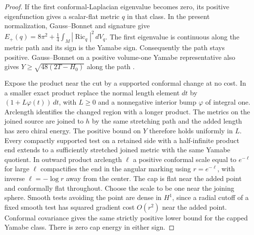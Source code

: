 \documentclass[11pt,letterpaper]{article}
\numberwithin{equation}{section}
\DeclareMathOperator{\Ric}{Ric}
\begin{document}
\begin{proof}
If the first conformal-Laplacian eigenvalue becomes zero, its
positive eigenfunction gives a scalar-flat metric \(q\) in that
class. In the present normalization, Gauss--Bonnet and signature
give \(E_+(q)=8\pi^2+\frac14\int_M|\Ric_q|^2\,dV_q\).
The first eigenvalue is continuous along the metric path and its
sign is the Yamabe sign. Consequently the path stays positive.
Gauss--Bonnet on a positive volume-one Yamabe representative
also gives \(Y\ge\sqrt{48(2T-H_0)}\) along the path
\cite[\S2]{LeeParker1987Yamabe}
\cite[A short marked cut]{Baker2026FixedDescent}.

Expose the product near the cut by a supported conformal change
at no cost. In a smaller exact product replace the normal
length element \(dt\) by \((1+L\varphi(t))\,dt\), with \(L\ge0\)
and a nonnegative interior bump \(\varphi\) of integral one.
Arclength identifies the changed region with a longer product.
The metrics on the joined source are joined to \(h\) by the same
stretching path and the added length has zero chiral energy.
The positive bound on \(Y\) therefore holds uniformly in \(L\).
Every compactly supported test on a retained side with a
half-infinite product end extends to a sufficiently stretched
joined metric with the same Yamabe quotient. In outward product
arclength \(\ell\) a positive conformal scale equal to \(e^{-\ell}\)
for large \(\ell\) compactifies the end in the angular marking
using \(r=e^{-\ell}\), with inverse \(\ell=-\log r\) away from
the center. The cap is flat near the added point and conformally
flat throughout. Choose the scale to be one near the joining
sphere. Smooth tests avoiding the point are dense in \(H^1\), since
a radial cutoff of a fixed smooth test has squared gradient
cost \(O(r^2)\) near the added point. Conformal covariance gives
the same strictly positive lower bound for the capped Yamabe
class. There is zero cap energy in either sign.
\end{proof}
\end{document}
